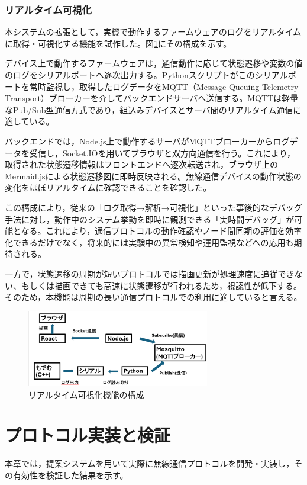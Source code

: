 \documentclass[technicalreport]{ieicej}
\begin{document}
\subsubsection{リアルタイム可視化}
本システムの拡張として，実機で動作するファームウェアのログをリアルタイムに取得・可視化する機能を試作した。図\ref{fig:realtime-structure}にその構成を示す。

デバイス上で動作するファームウェアは，通信動作に応じて状態遷移や変数の値のログをシリアルポートへ逐次出力する。Pythonスクリプトがこのシリアルポートを常時監視し，取得したログデータをMQTT（Message Queuing Telemetry Transport）ブローカーを介してバックエンドサーバへ送信する。MQTTは軽量なPub/Sub型通信方式であり，組込みデバイスとサーバ間のリアルタイム通信に適している。

バックエンドでは，Node.js上で動作するサーバがMQTTブローカーからログデータを受信し，Socket.IOを用いてブラウザと双方向通信を行う。これにより，取得された状態遷移情報はフロントエンドへ逐次転送され，ブラウザ上のMermaid.jsによる状態遷移図に即時反映される。無線通信デバイスの動作状態の変化をほぼリアルタイムに確認できることを確認した。

この構成により，従来の「ログ取得→解析→可視化」といった事後的なデバッグ手法に対し，動作中のシステム挙動を即時に観測できる「実時間デバッグ」が可能となる。これにより，通信プロトコルの動作確認やノード間同期の評価を効率化できるだけでなく，将来的には実験中の異常検知や運用監視などへの応用も期待される。

一方で，状態遷移の周期が短いプロトコルでは描画更新が処理速度に追従できない、もしくは描画できても高速に状態遷移が行われるため，視認性が低下する。そのため，本機能は周期の長い通信プロトコルでの利用に適していると言える。

\begin{figure}[h]
\centering
\includegraphics[width=80mm]{./images/2_realtime.png}
\caption{リアルタイム可視化機能の構成}
\label{fig:realtime-structure}
\end{figure}

\section{プロトコル実装と検証}
本章では，提案システムを用いて実際に無線通信プロトコルを開発・実装し，その有効性を検証した結果を示す。
\end{document}
